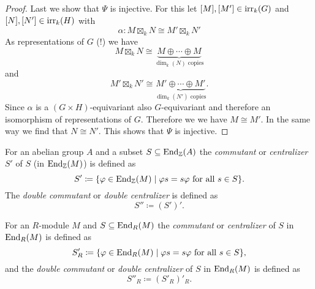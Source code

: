 \begin{proof}
  Last we show that $\Psi$ is injective. For this let $[M], [M'] \in \operatorname{irr}_k(G)$ and $[N], [N'] \in \operatorname{irr}_k(H)$ with
  \[
    \alpha \colon M \boxtimes_k N \cong M' \boxtimes_k N'
  \]
  As representations of $G$ (!) we have
  \[
    M \boxtimes_k N \cong \underbrace{M \oplus \dotsb \oplus M}_{\dim_k(N) \text{ copies}}
  \]
  and
  \[
    M' \boxtimes_k N' \cong \underbrace{M' \oplus \dotsb \oplus M'}_{\dim_k(N') \text{ copies}}.
  \]
  Since $\alpha$ is a $(G \times H)$-equivariant also $G$-equivariant and therefore an isomorphism of representations of $G$. Therefore we we have $M \cong M'$. In the same way we find that $N \cong N'$. This shows that $\Psi$ is injective.
\end{proof}


\begin{defi}
  For an abelian group $A$ and a subset $S \subseteq \operatorname{End}_{\mathbb{Z}}(A)$ the \emph{commutant} or \emph{centralizer} $S'$ of $S$ (in $\operatorname{End}_{\mathbb{Z}}(M)$) is defined as
  \[
    S' \coloneqq \{ \varphi \in \operatorname{End}_{\mathbb{Z}}(M) \mid \varphi s = s \varphi \text{ for all } s \in S \}.
  \]
  The \emph{double commutant} or \emph{double centralizer} is defined as
  \[
    S'' \coloneqq (S')'.
  \]
  
  For an $R$-module $M$ and $S \subseteq \operatorname{End}_R(M)$ the \emph{commutant} or \emph{centralizer} of $S$ in $\operatorname{End}_R(M)$ is defined as
  \[
    S'_R \coloneqq \{ \varphi \in \operatorname{End}_R(M) \mid \varphi s = s \varphi \text{ for all } s \in S \},
  \]
  and the \emph{double commutant} or \emph{double centralizer} of $S$ in $\operatorname{End}_R(M)$ is defined as
  \[
    S''_R \coloneqq (S'_R)'_R.
  \]
\end{defi}


